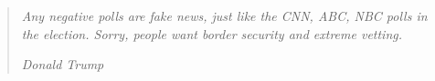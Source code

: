 \documentclass[../Main/thesis.tex]{subfiles}
\begin{document}
\chapter*{}
\null\vfill
\begin{quotation}
\em %
Any negative polls are fake news, just like the CNN, ABC, NBC polls in the election. Sorry, people want border security and extreme vetting.

\em
\medskip
\raggedleft
Donald Trump
\end{quotation}
\vfill\vfill
\end{document}
